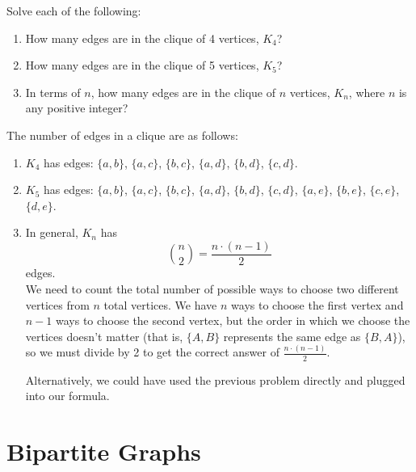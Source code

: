 \documentclass[11pt]{article}
\begin{document}
\begin{problem} %
Solve each of the following:
\begin{enumerate}[label=(\alph*)]
\item How many edges are in the clique of 4 vertices, $K_4$?
\item How many edges are in the clique of 5 vertices, $K_5$?
\item In terms of $n$, how many edges are in the clique of $n$ vertices, $K_n$, where $n$ is any positive integer?
\end{enumerate}
\end{problem}

\begin{solution} 
The number of edges in a clique are as follows:
\begin{enumerate}[label=(\alph*)]
\item $K_4$ has  edges: $\{a, b\}$, $\{a, c\}$, $\{b, c\}$, $\{a, d\}$, $\{b, d\}$, $\{c, d\}$.
\item $K_5$ has  edges: $\{a, b\}$, $\{a, c\}$, $\{b, c\}$, $\{a, d\}$, $\{b, d\}$, $\{c, d\}$, $\{a, e\}$, $\{b, e\}$, $\{c, e\}$, $\{d,e\}$.
\item In general, $K_n$ has
\[\binom{n}{2} = \boxed{\frac{n \cdot (n - 1)}{2}}\]
edges. \\
We need to count the total number of possible ways to choose two different vertices from $n$ total vertices. We have $n$ ways to choose the first vertex
and $n - 1$ ways to choose the second vertex, but the order in which we choose the vertices doesn't matter (that is, $\{A,B\}$ represents the same edge
as $\{B, A\}$), so we must divide by 2 to get the correct answer of $\frac{n \cdot (n - 1)}{2}$.

Alternatively, we could have used the previous problem directly and plugged into our formula.
\end{enumerate}
\end{solution}

\section{Bipartite Graphs}
\end{document}
